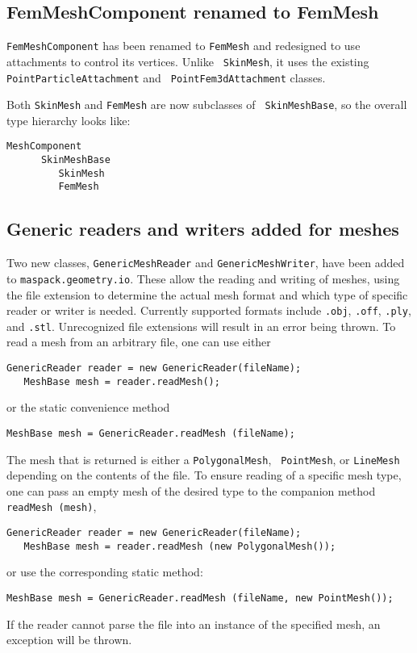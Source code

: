 \documentclass{article}
\begin{document}
\subsection*{FemMeshComponent renamed to FemMesh}

{\tt FemMeshComponent} has been renamed to {\tt FemMesh} and
redesigned to use attachments to control its vertices. Unlike {\tt
SkinMesh}, it uses the existing {\tt PointParticleAttachment} and {\tt
PointFem3dAttachment} classes.

Both {\tt SkinMesh} and {\tt FemMesh} are now subclasses of {\tt
SkinMeshBase}, so the overall type hierarchy looks like:
\begin{lstlisting}[]
   MeshComponent
      SkinMeshBase
         SkinMesh
         FemMesh 
\end{lstlisting}

\subsection*{Generic readers and writers added for meshes}

Two new classes, {\tt GenericMeshReader} and {\tt GenericMeshWriter},
have been added to {\tt maspack.geometry.io}. These allow the reading
and writing of meshes, using the file extension to determine the
actual mesh format and which type of specific reader or writer is
needed. Currently supported formats include {\tt .obj}, {\tt .off},
{\tt .ply}, and {\tt .stl}. Unrecognized file extensions will result
in an error being thrown. To read a mesh from an arbitrary file, one
can use either
\begin{lstlisting}[]
   GenericReader reader = new GenericReader(fileName);
   MeshBase mesh = reader.readMesh();
\end{lstlisting}
or the static convenience method
\begin{lstlisting}[]
   MeshBase mesh = GenericReader.readMesh (fileName);
\end{lstlisting}
The mesh that is returned is either a {\tt PolygonalMesh}, {\tt
PointMesh}, or {\tt LineMesh} depending on the contents of the
file. To ensure reading of a specific mesh type, one can pass
an empty mesh of the desired type to the companion method
{\tt readMesh (mesh)},
\begin{lstlisting}[]
   GenericReader reader = new GenericReader(fileName);
   MeshBase mesh = reader.readMesh (new PolygonalMesh());
\end{lstlisting}
or use the corresponding static method:
\begin{lstlisting}[]
   MeshBase mesh = GenericReader.readMesh (fileName, new PointMesh());
\end{lstlisting}
If the reader cannot parse the file into an instance of the specified
mesh, an exception will be thrown.
\end{document}
